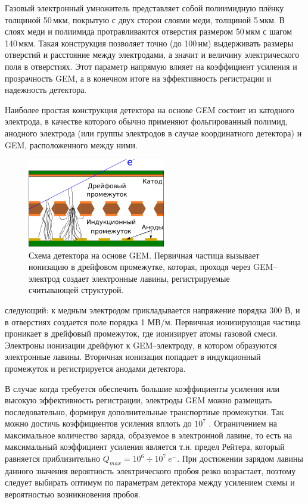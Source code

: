  Газовый электронный умножитель представляет собой полиимидную плёнку толщиной 50\,мкм, покрытую с двух сторон слоями меди, толщиной 5\,мкм. В слоях меди и полиимида протравливаются отверстия размером 50\,мкм с шагом 140\,мкм. Такая конструкция позволяет точно (до 100\,нм) выдерживать размеры отверстий и расстояние между электродами, а значит и величину электрического поля в отверстиях. Этот параметр напрямую влияет на коэффициент усиления и прозрачность GEM, а в конечном итоге на эффективность регистрации и надежность детектора.
 \par Наиболее простая конструкция детектора на основе  GEM состоит из катодного электрода, в качестве которого обычно применяют фольгированный полимид, анодного электрода (или группы электродов в случае координатного детектора) и GEM, расположенного между ними.
 \begin{figure}[h]
	\centering
	\includegraphics[height = 4 cm, width= 6cm]{img/GEM_scheme.pdf}
	\caption{Схема детектора на основе GEM. Первичная частица вызывает ионизацию в дрейфовом промежутке, которая, проходя через GEM--электрод создает электронные лавины, регистрируемые считывающей структурой.}
	\label{fig:single} 	
 \end{figure}
  следующий: к медным электродом прикладывается напряжение порядка 300 В, и в отверстиях создается поле порядка 1 МВ/м. Первичная ионизирующая частица проникает в дрейфовый промежуток, где ионизирует атомы газовой смеси. Электроны ионизации дрейфуют к GEM--электроду, в котором образуются электронные лавины. Вторичная ионизация попадает в индукционный промежуток и регистрируется анодами детектора.
 \par В случае когда требуется обеспечить большие коэффициенты усиления или высокую эффективность регистрации, электроды GEM можно размещать последовательно, формируя дополнительные транспортные промежутки. Так можно достичь коэффициентов усиления вплоть до $10^7$ \cite{sauli}. Ограничением на максимальное количество заряда, образуемое в электронной лавине, то есть на максимальный коэффициент усиления является т.н. предел Рейтера, который равняется приблизительно $Q_{max} = 10^6\div10^7~e^-$. При достижении зарядом лавины данного значения вероятность электрического пробоя резко возрастает, поэтому следует выбирать оптимум по параметрам детектора между усилением схемы и вероятностью возникновения пробоя. 
  
 



